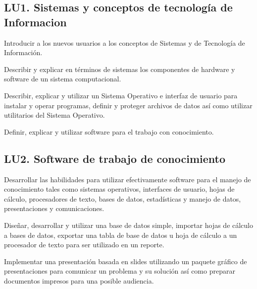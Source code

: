 \subsection{LU1. Sistemas y conceptos de tecnología de Informacion}\label{sec:LU1}
\begin{LearningUnit}
\begin{LUGoal}
\item Introducir a los nuevos usuarios a los conceptos de Sistemas y de Tecnología de Información.
\end{LUGoal}

\begin{LUObjective}
\item Describir y explicar en términos de sistemas los componentes de hardware y software de un sistema computacional.
\item Describir, explicar y utilizar un Sistema Operativo e interfaz de usuario para instalar y operar programas, definir y proteger archivos de datos así como utilizar utilitarios del Sistema Operativo.
\item Definir, explicar y utilizar software para el trabajo con conocimiento.
\end{LUObjective}
\end{LearningUnit}

\subsection{LU2. Software de trabajo de conocimiento}\label{sec:LU2}
\begin{LearningUnit}
\begin{LUGoal}
\item Desarrollar las habilidades para utilizar efectivamente software para el manejo de conocimiento tales como sistemas operativos, interfaces de usuario, hojas de cálculo, procesadores de texto, bases de datos, estadísticas y manejo de datos, presentaciones y comunicaciones.
\end{LUGoal}

\begin{LUObjective}
\item Diseñar, desarrollar y utilizar una base de datos simple, importar hojas de cálculo a bases de datos, exportar una tabla de base de datos u hoja de cálculo a un procesador de texto para ser utilizado en un reporte.
\item Implementar una presentación basada en slides utilizando un paquete gráfico de presentaciones para comunicar un problema y su solución así como preparar documentos impresos para una posible audiencia.
\end{LUObjective}
\end{LearningUnit}

